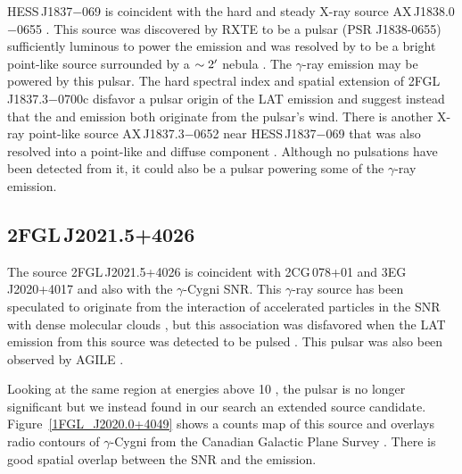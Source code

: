 \documentclass[12pt,preprint]{aastex}
\newcommand{\gev}{\text{GeV}\xspace}
\newcommand{\tev}{\text{TeV}\xspace}
\newcommand{\chandra}{\text{{\em Chandra}}\xspace}
\begin{document}
HESS\,J1837$-$069 is coincident with the hard and steady X-ray source
AX\,J1838.0$-$0655 \citep{hard_x-ray_asca}.  This source was discovered
by RXTE to be a pulsar (PSR J1838-0655) 
sufficiently luminous to power the \tev emission
and was resolved by \chandra to be a bright point-like source surrounded
by a $\sim2\mbox{$^\prime$}$ nebula \citep{pulsations_HESS_J1837-069}. The
$\gamma$-ray emission may be powered by this pulsar.  The hard spectral
index and spatial extension of 2FGL\,J1837.3$-$0700c disfavor a pulsar
origin of the LAT emission and suggest instead that the \gev and \tev
emission both originate from the pulsar's wind.  There is another
X-ray point-like source AX\,J1837.3$-$0652 near HESS\,J1837$-$069
\citep{hard_x-ray_asca} that was also resolved into a point-like
and diffuse component \citep{pulsations_HESS_J1837-069}.  Although no
pulsations have been detected from it, it could also be a pulsar powering
some of the $\gamma$-ray emission.


\subsection{2FGL\,J2021.5+4026}
\label{section_2FGL J2021.5+4026}





The source 2FGL\,J2021.5+4026 is coincident with 2CG\,078+01 and
3EG\,J2020+4017 \citep{second_cos_b_catalog,third_egret_catalog} and also
with the $\gamma$-Cygni SNR. This $\gamma$-ray source has been speculated
to originate from the interaction of accelerated particles in the SNR
with dense molecular clouds \citep{pollock_1985,gaisser_1998}, but this
association was disfavored when the LAT \gev emission from this source
was detected to be pulsed \citep[PSR\,J2021+4026,][]{first_lat_pulsar_cat}.
This pulsar was also been observed by AGILE \citep{gamma_cygni_agile}.

Looking at the same region at energies above 10 \gev, the pulsar is
no longer significant but we instead found in our search an extended
source candidate.  Figure~\ref{1FGL_J2020.0+4049} shows a counts map
of this source and overlays radio contours of $\gamma$-Cygni from the
Canadian Galactic Plane Survey \citep{canadian_galactic_plane_survey}.
There is good spatial overlap between the SNR and the \gev emission.
\end{document}
